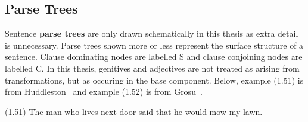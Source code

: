 \documentclass{article}
\begin{document}

\subsection{Parse Trees}

Sentence \textbf{parse trees} are only drawn schematically in
this thesis as extra detail is unnecessary. Parse trees shown
more or less represent the surface structure of a
sentence. Clause dominating nodes are labelled S and clause
conjoining nodes are labelled C. In this thesis, genitives and
adjectives are not treated as arising from transformations, but
as occuring in the base component.  Below, example (1.51) is
from Huddleston~\cite{Huddleston78} and example (1.52) is from
Grosu~\cite{Grosu73}.

\bigbreak
\begin{minipage}{\textwidth}
\begin{enumerate*}
\item[(1.51)] The man who lives next door said that he would
mow my lawn.
\end{enumerate*}
\bigbreak
\centering
{}
\end{minipage}
\bigbreak
\end{document}
